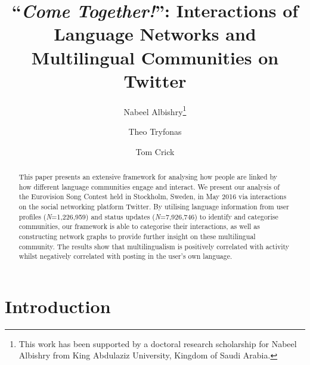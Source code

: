\documentclass{llncs}
\begin{document}
\title{``{\emph{Come Together!}}'': Interactions of Language Networks and Multilingual Communities on Twitter}

\author{Nabeel Albishry\thanks{This work has been supported by a doctoral research scholarship for
Nabeel Albishry from King Abdulaziz University, Kingdom of Saudi
Arabia.} \and Theo Tryfonas \and Tom
  Crick}



\maketitle

\begin{abstract}
This paper presents an extensive framework for analysing how people
are linked by how different language communities engage and interact.
We present our analysis of the Eurovision Song Contest held in
Stockholm, Sweden, in May 2016 via interactions on the social
networking platform Twitter.  By utilising language information from
user profiles ({\emph{N}}=1,226,959) and status updates
({\emph{N}}=7,926,746) to identify and categorise communities, our
framework is able to categorise their interactions, as well as
constructing network graphs to provide further insight on these
multilingual community.  The results show that multilingualism is
positively correlated with activity whilst negatively correlated with
posting in the user's own language.
 \end{abstract}

\section{Introduction}\label{intro}
\end{document}
